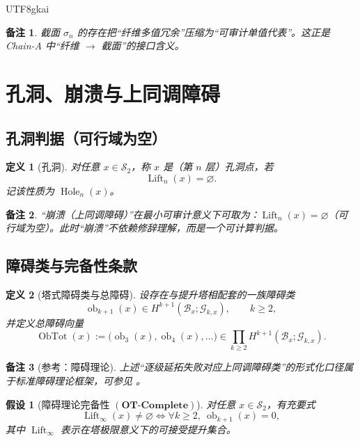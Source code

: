\documentclass[12pt]{article}
\newtheorem{definition}{定义}[section]
\newtheorem{assumption}{假设}[section]
\newtheorem{remark}{备注}[section]
\newcommand{\ObTot}{\operatorname{ObTot}}
\newcommand{\Hole}{\operatorname{Hole}}
\newcommand{\Lift}{\operatorname{Lift}}
\begin{document}
\begin{CJK*}{UTF8}{gkai}
\begin{remark}
截面 $\sigma_n$ 的存在把“纤维多值冗余”压缩为“可审计单值代表”。这正是 Chain-A 中“纤维 $\to$ 截面”的接口含义。
\end{remark}

\section{孔洞、崩溃与上同调障碍}

\subsection{孔洞判据（可行域为空）}

\begin{definition}[孔洞]\label{def:hole}
对任意 $x\in\mathcal S_2$，称 $x$ 是（第 $n$ 层）孔洞点，若
\[
\Lift_n(x)=\varnothing.
\]
记该性质为 $\Hole_n(x)$。
\end{definition}

\begin{remark}
“崩溃（上同调障碍）”在最小可审计意义下可取为：$\Lift_n(x)=\varnothing$（可行域为空）。此时“崩溃”不依赖修辞理解，而是一个可计算判据。
\end{remark}

\subsection{障碍类与完备性条款}

\begin{definition}[塔式障碍类与总障碍]\label{def:obstruction-tower}
设存在与提升塔相配套的一族障碍类
\[
\operatorname{ob}_{k+1}(x)\in H^{k+1}(\mathcal B_x;\mathcal G_{k,x}),\qquad k\ge2,
\]
并定义总障碍向量
\[
\ObTot(x):=\bigl(\operatorname{ob}_3(x),\operatorname{ob}_4(x),\ldots\bigr)
\in \prod_{k\ge2} H^{k+1}(\mathcal B_x;\mathcal G_{k,x}).
\]
\end{definition}

\begin{remark}[参考：障碍理论]
上述“逐级延拓失败对应上同调障碍类”的形式化口径属于标准障碍理论框架，可参见 \cite{Hatcher2002,Whitehead1978}。
\end{remark}

\begin{assumption}[障碍理论完备性 $\mathbf{(OT\text{-}Complete)}$]\label{ass:ot-complete}
对任意 $x\in\mathcal S_2$，有充要式
\[
\Lift_\infty(x)\neq\varnothing
\iff
\forall k\ge2,\ \operatorname{ob}_{k+1}(x)=0,
\]
其中 $\Lift_\infty$ 表示在塔极限意义下的可接受提升集合。
\end{assumption}


\end{CJK*}
\end{document}
